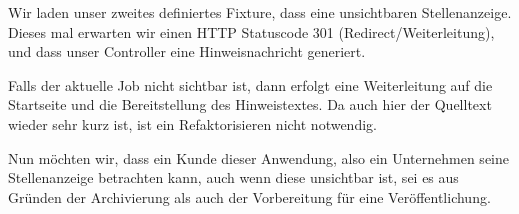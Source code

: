\tddred

Wir laden unser zweites definiertes Fixture, dass eine unsichtbaren Stellenanzeige. Dieses mal erwarten wir einen HTTP Statuscode 301 (Redirect/Weiterleitung), und dass unser Controller eine Hinweisnachricht generiert.

%                                                                                                                                                                    
\begin{ruby}[label=app/controllers/jobs\_controller.rb]
 
    \PY{o}{[}\PY{o}{]}
    
        
\end{ruby}

\tddgreen
Falls der aktuelle Job nicht sichtbar ist, dann erfolgt eine Weiterleitung auf die Startseite und die Bereitstellung des Hinweistextes.
\tddrefactor
Da auch hier der Quelltext wieder sehr kurz ist, ist ein Refaktorisieren nicht notwendig.

Nun möchten wir, dass ein Kunde dieser Anwendung, also ein Unternehmen seine Stellenanzeige betrachten kann, auch wenn diese unsichtbar ist, sei es aus Gründen der Archivierung als auch der Vorbereitung für eine Veröffentlichung.

